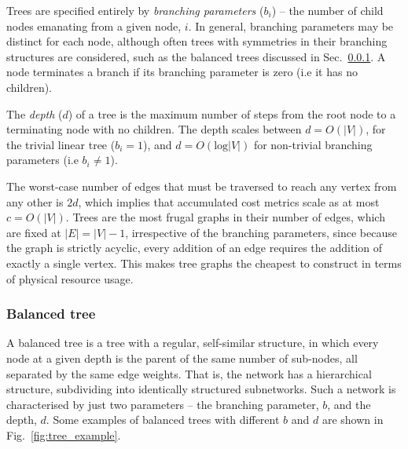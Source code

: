 \documentclass[aps,rmp,twocolumn,amsmath,amssymb,nofootinbib,superscriptaddress,longbibliography,floatfix,table-of-contents,eqsecnum]{revtex4-1}
\begin{document}
Trees are specified entirely by \textit{branching parameters} ($b_i$) -- the number of child nodes emanating from a given node, $i$. In general, branching parameters may be distinct for each node, although often trees with symmetries in their branching structures are considered, such as the balanced trees discussed in Sec.~\ref{sec:bal_tree}. A node terminates a branch if its branching parameter is zero (i.e it has no children).

The \textit{depth} ($d$) of a tree is the maximum number of steps from the root node to a terminating node with no children. The depth scales between \mbox{$d=O(|V|)$}, for the trivial linear tree (\mbox{$b_i=1$}), and \mbox{$d=O(\text{log}|V|)$} for non-trivial branching parameters (i.e \mbox{$b_i\neq 1$}).

The worst-case number of edges that must be traversed to reach any vertex from any other is $2d$, which implies that accumulated cost metrics scale as at most \mbox{$c=O(|V|)$}. Trees are the most frugal graphs in their number of edges, which are fixed at \mbox{$|E|=|V|-1$}, irrespective of the branching parameters, since because the graph is strictly acyclic, every addition of an edge requires the addition of exactly a single vertex. This makes tree graphs the cheapest to construct in terms of physical resource usage.

%
%

\subsubsection{Balanced tree} \label{sec:bal_tree} 

A balanced tree is a tree with a regular, self-similar structure, in which every node at a given depth is the parent of the same number of sub-nodes, all separated by the same edge weights. That is, the network has a hierarchical structure, subdividing into identically structured subnetworks. Such a network is characterised by just two parameters -- the branching parameter, $b$, and the depth, $d$. Some examples of balanced trees with different $b$ and $d$ are shown in Fig.~\ref{fig:tree_example}.
\end{document}
